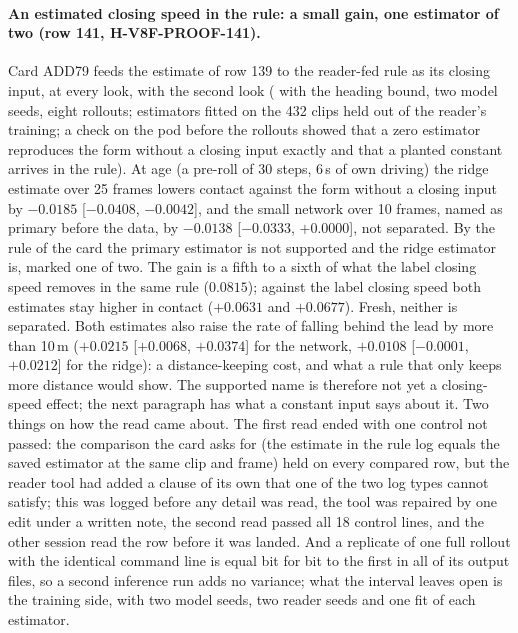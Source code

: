 \paragraph{An estimated closing speed in the rule: a small gain, one estimator of two (row 141, H-V8F-PROOF-141).} Card ADD79 feeds the estimate of row 139 to the reader-fed rule as its closing input, at every look, with the second look ( with the heading bound, two model seeds, eight rollouts; estimators fitted on the 432 clips held out of the reader's training; a check on the pod before the rollouts showed that a zero estimator reproduces the form without a closing input exactly and that a planted constant arrives in the rule). At age (a pre-roll of 30 steps, 6\,s of own driving) the ridge estimate over 25 frames lowers contact against the form without a closing input by $-0.0185$ [$-0.0408$, $-0.0042$], and the small network over 10 frames, named as primary before the data, by $-0.0138$ [$-0.0333$, $+0.0000$], not separated. By the rule of the card the primary estimator is not supported and the ridge estimator is, marked one of two. The gain is a fifth to a sixth of what the label closing speed removes in the same rule ($0.0815$); against the label closing speed both estimates stay higher in contact ($+0.0631$ and $+0.0677$). Fresh, neither is separated. Both estimates also raise the rate of falling behind the lead by more than 10\,m ($+0.0215$ [$+0.0068$, $+0.0374$] for the network, $+0.0108$ [$-0.0001$, $+0.0212$] for the ridge): a distance-keeping cost, and what a rule that only keeps more distance would show. The supported name is therefore not yet a closing-speed effect; the next paragraph has what a constant input says about it. Two things on how the read came about. The first read ended with one control not passed: the comparison the card asks for (the estimate in the rule log equals the saved estimator at the same clip and frame) held on every compared row, but the reader tool had added a clause of its own that one of the two log types cannot satisfy; this was logged before any detail was read, the tool was repaired by one edit under a written note, the second read passed all 18 control lines, and the other session read the row before it was landed. And a replicate of one full rollout with the identical command line is equal bit for bit to the first in all of its output files, so a second inference run adds no variance; what the interval leaves open is the training side, with two model seeds, two reader seeds and one fit of each estimator.

